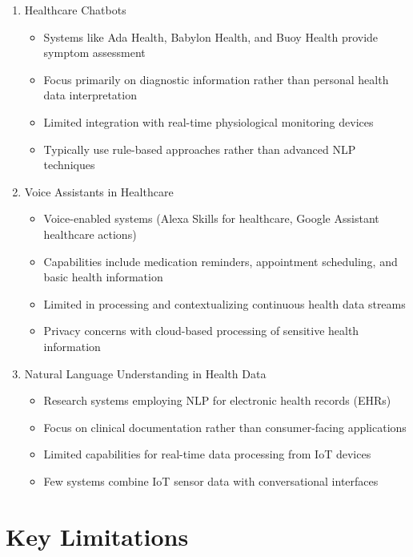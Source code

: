 \begin{enumerate}
    \item Healthcare Chatbots
    \begin{itemize}
        \item Systems like Ada Health, Babylon Health, and Buoy Health provide symptom assessment
        \item Focus primarily on diagnostic information rather than personal health data interpretation
        \item Limited integration with real-time physiological monitoring devices
        \item Typically use rule-based approaches rather than advanced NLP techniques
    \end{itemize}

    \item Voice Assistants in Healthcare
    \begin{itemize}
        \item Voice-enabled systems (Alexa Skills for healthcare, Google Assistant healthcare actions)
        \item Capabilities include medication reminders, appointment scheduling, and basic health information
        \item Limited in processing and contextualizing continuous health data streams
        \item Privacy concerns with cloud-based processing of sensitive health information
    \end{itemize}

    \item Natural Language Understanding in Health Data
    \begin{itemize}
        \item Research systems employing NLP for electronic health records (EHRs)
        \item Focus on clinical documentation rather than consumer-facing applications
        \item Limited capabilities for real-time data processing from IoT devices
        \item Few systems combine IoT sensor data with conversational interfaces
    \end{itemize}
\end{enumerate}

\section{Key Limitations}

